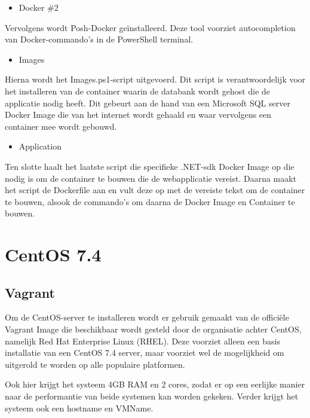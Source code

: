 \begin{itemize}[noitemsep]
	\item Docker \#2
\end{itemize}

Vervolgens wordt Posh-Docker geïnstalleerd. Deze tool voorziet autocompletion van Docker-commando's in de PowerShell terminal.

\begin{itemize}[noitemsep]
	\item Images
\end{itemize}

Hierna wordt het Images.ps1-script uitgevoerd. Dit script is verantwoordelijk voor het installeren van de container waarin de databank wordt gehost die de applicatie nodig heeft. Dit gebeurt aan de hand van een Microsoft SQL server Docker Image die van het internet wordt gehaald en waar vervolgens een container mee wordt gebouwd.

\begin{itemize}[noitemsep]
	\item Application
\end{itemize}

Ten slotte haalt het laatste script die specifieke .NET-sdk Docker Image op die nodig is om de container te bouwen die de webapplicatie vereist. Daarna maakt het script de Dockerfile aan en vult deze op met de vereiste tekst om de container te bouwen, alsook de commando's om daarna de Docker Image en Container te bouwen.

\section{CentOS 7.4}

\subsection{Vagrant}
Om de CentOS-server te installeren wordt er gebruik gemaakt van de officiële Vagrant Image die beschikbaar wordt gesteld door de organisatie achter CentOS, namelijk Red Hat Enterprise Linux (RHEL). Deze voorziet alleen een basis installatie van een CentOS 7.4 server, maar voorziet wel de mogelijkheid om uitgerold te worden op alle populaire platformen.


Ook hier krijgt het systeem 4GB RAM en 2 cores, zodat er op een eerlijke manier naar de performantie van beide systemen kan worden gekeken. Verder krijgt het systeem ook een hostname en VMName.

